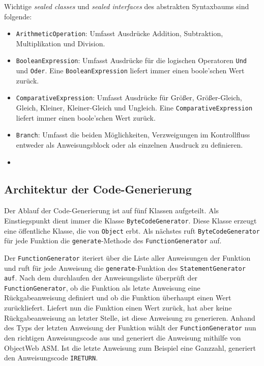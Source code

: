 Wichtige \textit{sealed classes} und \textit{sealed interfaces} des abstrakten Syntaxbaums sind folgende:

\begin{itemize}
    \item \texttt{ArithmeticOperation}: Umfasst Ausdrücke Addition, Subtraktion, Multiplikation und Division.
    \item \texttt{BooleanExpression}: Umfasst Ausdrücke für die logischen Operatoren \texttt{Und} und \texttt{Oder}. Eine \texttt{BooleanExpression} liefert immer einen boole'schen Wert zurück.
    \item \texttt{ComparativeExpression}: Umfasst Ausdrücke für Größer, Größer-Gleich, Gleich, Kleiner, Kleiner-Gleich und Ungleich. Eine \texttt{ComparativeExpression} liefert immer einen boole'schen Wert zurück.
    \item \texttt{Branch}: Umfasst die beiden Möglichkeiten, Verzweigungen im Kontrollfluss entweder als Anweisungsblock oder als einzelnen Ausdruck zu definieren.
    \item 
\end{itemize}

\subsection{Architektur der Code-Generierung}

Der Ablauf der Code-Generierung ist auf fünf Klassen aufgeteilt. Als Einstiegspunkt dient immer die Klasse \texttt{ByteCodeGenerator}. Diese Klasse erzeugt eine öffentliche Klasse, die von \texttt{Object} erbt. Als nächstes ruft \texttt{ByteCodeGenerator} für jede Funktion die \texttt{generate}-Methode des \texttt{FunctionGenerator} auf.

Der \texttt{FunctionGenerator} iteriert über die Liste aller Anweisungen der Funktion und ruft für jede Anweisung die \texttt{generate}-Funktion des \texttt{StatementGenerator auf}. Nach dem durchlaufen der Anweisungsliste überprüft der \texttt{FunctionGenerator}, ob die Funktion als letzte Anweisung eine Rückgabeanweisung definiert und ob die Funktion überhaupt einen Wert zurückliefert. Liefert nun die Funktion einen Wert zurück, hat aber keine Rückgabeanweisung an letzter Stelle, ist diese Anweisung zu generieren. Anhand des Typs der letzten Anweisung der Funktion wählt der \texttt{FunctionGenerator} nun den richtigen Anweisungscode aus und generiert die Anweisung mithilfe von ObjectWeb ASM. Ist die letzte Anweisung zum Beispiel eine Ganzzahl, generiert \toya den Anweisungscode \texttt{IRETURN}.

